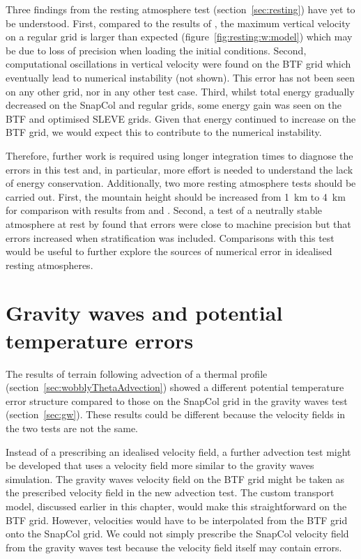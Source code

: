 Three findings from the resting atmosphere test (section~\ref{sec:resting}) have yet to be understood.  First, compared to the results of \textcite{good2013}, the maximum vertical velocity on a regular grid is larger than expected (figure~\ref{fig:resting:w:model}) which may be due to loss of precision when loading the initial conditions.
Second, computational oscillations in vertical velocity were found on the BTF grid which eventually lead to numerical instability (not shown).  This error has not been seen on any other grid, nor in any other test case.
Third, whilst total energy gradually decreased on the SnapCol and regular grids, some energy gain was seen on the BTF and optimised SLEVE grids.  Given that energy continued to increase on the BTF grid, we would expect this to contribute to the numerical instability.

Therefore, further work is required using longer integration times to diagnose the errors in this test and, in particular, more effort is needed to understand the lack of energy conservation.  Additionally, two more resting atmosphere tests should be carried out.  First, the mountain height should be increased from \SI{1}{\kilo\meter} to \SI{4}{\kilo\meter} for comparison with results from \textcite{zaengl2012} and \textcite{good2013}.  Second, a test of a neutrally stable atmosphere at rest by \textcite{botta2004} found that errors were close to machine precision but that errors increased when stratification was included.  Comparisons with this test would be useful to further explore the sources of numerical error in idealised resting atmospheres.

\section{Gravity waves and potential temperature errors}
\label{sec:further-work:gw}

The results of terrain following advection of a thermal profile (section~\ref{sec:wobblyThetaAdvection}) showed a different potential temperature error structure compared to those on the SnapCol grid in the gravity waves test (section~\ref{sec:gw}).  These results could be different because the velocity fields in the two tests are not the same.

Instead of a prescribing an idealised velocity field, a further advection test might be developed that uses a velocity field more similar to the gravity waves simulation.
The gravity waves velocity field on the BTF grid might be taken as the prescribed velocity field in the new advection test.  The custom transport model, discussed earlier in this chapter, would make this straightforward on the BTF grid.  However, velocities would have to be interpolated from the BTF grid onto the SnapCol grid.  We could not simply prescribe the SnapCol velocity field from the gravity waves test because the velocity field itself may contain errors.

